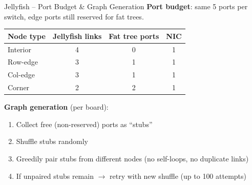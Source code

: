 \documentclass[t]{beamer}
\begin{document}
\begin{frame}{Jellyfish -- Port Budget \& Graph Generation}
    \textbf{Port budget}: same 5 ports per switch, edge ports still reserved for fat trees.

    \vspace{0.1cm}
    \footnotesize
    \begin{tabular}{lccc}
        \toprule
        \textbf{Node type} & \textbf{Jellyfish links} & \textbf{Fat tree ports} & \textbf{NIC} \\
        \midrule
        Interior  & 4 & 0 & 1 \\
        Row-edge  & 3 & 1 & 1 \\
        Col-edge  & 3 & 1 & 1 \\
        Corner    & 2 & 2 & 1 \\
        \bottomrule
    \end{tabular}
    \normalsize

    \vspace{0.3cm}

    \textbf{Graph generation} (per board):
    \begin{enumerate}
        \item Collect free (non-reserved) ports as ``stubs''
        \item Shuffle stubs randomly
        \item Greedily pair stubs from different nodes (no self-loops, no duplicate links)
        \item If unpaired stubs remain $\to$ retry with new shuffle (up to 100 attempts)
    \end{enumerate}
\end{frame}
\end{document}
